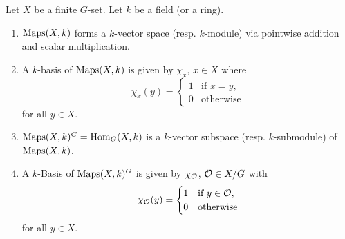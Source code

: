 \begin{lem}\label{lem: basis of Maps and Hom}
  Let $X$ be a finite $G$-set. Let $k$ be a field (or a ring).
  \begin{enumerate}[label=\emph{\alph*)},leftmargin=*]
    \item
      $\operatorname{Maps}(X,k)$ forms a $k$-vector space (resp. $k$-module) via pointwise addition and scalar multiplication.
    \item
      A $k$-basis of $\operatorname{Maps}(X,k)$ is given by $\chi_x$, $x \in X$ where
      \[
        \chi_x(y) =
        \begin{cases}
          1 & \text{if } x=y, \\
          0 & \text{otherwise}
        \end{cases}
      \]
      for all $y \in X$.
    \item
      $\operatorname{Maps}(X,k)^G = \operatorname{Hom}_G(X,k)$ is a $k$-vector subspace (resp. $k$-submodule) of $\operatorname{Maps}(X,k)$.
    \item
      A $k$-Basis of $\operatorname{Maps}(X,k)^G$ is given by $\chi_\mathcal{O}$, $\mathcal{O} \in X/G$ with
      \[
        \chi_\mathcal{O}(y) =
        \begin{cases}
          1 & \text{if } y \in \mathcal{O}, \\
          0 & \text{otherwise}
        \end{cases}
      \]
      for all $y \in X$.
  \end{enumerate}
\end{lem}
